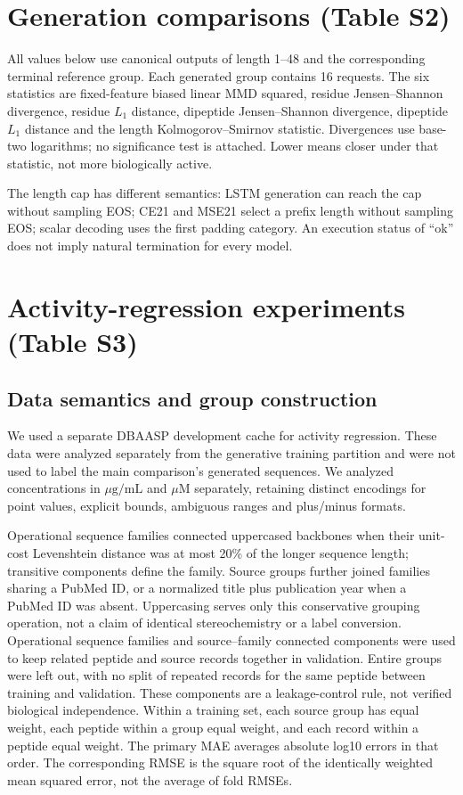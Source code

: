 \documentclass[11pt,a4paper]{article}
\newcommand{\ug}{\ensuremath{\mu\mathrm{g}/\mathrm{mL}}}
\begin{document}
\section{Generation comparisons (Table S2)}
All values below use canonical outputs of length 1--48 and the corresponding terminal reference group. Each generated group contains 16 requests. The six statistics are fixed-feature biased linear MMD squared, residue Jensen--Shannon divergence, residue $L_1$ distance, dipeptide Jensen--Shannon divergence, dipeptide $L_1$ distance and the length Kolmogorov--Smirnov statistic. Divergences use base-two logarithms; no significance test is attached. Lower means closer under that statistic, not more biologically active.

The length cap has different semantics: LSTM generation can reach the cap without sampling EOS; CE21 and MSE21 select a prefix length without sampling EOS; scalar decoding uses the first padding category. An execution status of ``ok'' does not imply natural termination for every model.


\section{Activity-regression experiments (Table S3)}
\subsection*{Data semantics and group construction}
We used a separate DBAASP development cache for activity regression. These data were analyzed separately from the generative training partition and were not used to label the main comparison's generated sequences. We analyzed concentrations in \ug{} and $\mu$M separately, retaining distinct encodings for point values, explicit bounds, ambiguous ranges and plus/minus formats.

Operational sequence families connected uppercased backbones when their unit-cost Levenshtein distance was at most 20\% of the longer sequence length; transitive components define the family. Source groups further joined families sharing a PubMed ID, or a normalized title plus publication year when a PubMed ID was absent. Uppercasing serves only this conservative grouping operation, not a claim of identical stereochemistry or a label conversion. Operational sequence families and source--family connected components were used to keep related peptide and source records together in validation. Entire groups were left out, with no split of repeated records for the same peptide between training and validation. These components are a leakage-control rule, not verified biological independence. Within a training set, each source group has equal weight, each peptide within a group equal weight, and each record within a peptide equal weight. The primary MAE averages absolute log10 errors in that order. The corresponding RMSE is the square root of the identically weighted mean squared error, not the average of fold RMSEs.
\end{document}
